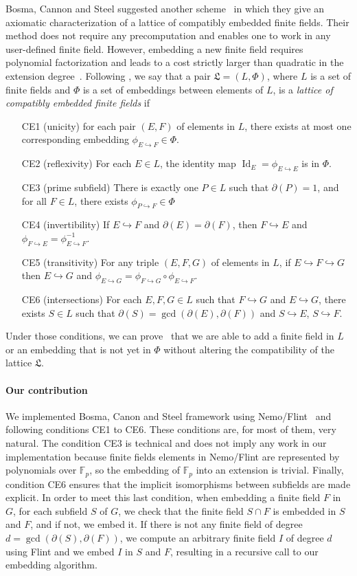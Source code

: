 \documentclass[12pt]{article}
\DeclareMathOperator{\Id}{Id}
\newcommand{\dE}{\partial(E)}
\newcommand{\dF}{\partial(F)}
\newcommand{\emb}{\hookrightarrow}
\newcommand{\embed}[2]{\phi_{#1\hookrightarrow#2}}
\begin{document}
Bosma, Cannon and Steel suggested another scheme~\cite{BCS97} in which they
give an axiomatic characterization of a lattice of compatibly embedded finite
fields. Their method does not require any precomputation and enables one to work in
any user-defined finite field. However, embedding a new finite field requires
polynomial factorization and leads to a cost strictly larger than quadratic in
the extension degree~\cite{BDDFS17}.
Following \cite{BCS97}, we say that a pair $\mathfrak L=(L, \Phi)$, where
$L$ is a set of finite fields and $\Phi$ is a set of embeddings between
elements of $L$, is a \emph{lattice of compatibly
embedded finite fields} if
\begin{enumerate}
  \item[CE1] (unicity) for each pair $(E, F)$ of elements in $L$, there exists
    at most one corresponding embedding $\embed{E}{F}\in\Phi$.
  \item[CE2] (reflexivity) For each $E\in L$, the identity map
    $\Id_E=\embed{E}{E}$ is in $\Phi$.
  \item[CE3] (prime subfield) There is exactly one $P\in L$ such that $\partial
    (P) = 1$, and for all $F\in L$, there exists $\embed{P}{F}\in\Phi$
  \item[CE4] (invertibility) If $E\emb F$ and $\dE=\dF$, then $F\emb E$ and
    $\embed{F}{E}=\embed{E}{F}^{-1}$.
  \item[CE5] (transitivity) For any triple $(E, F, G)$ of elements in $L$, if $E\emb
    F\emb G$ then $E\emb G$ and
    $\embed{E}{G}=\embed{F}{G}\circ\embed{E}{F}$.
  \item[CE6](intersections) For each $E, F, G\in L$ such that $F\emb G$ and
    $E\emb G$, there exists $S\in L$ such that $\partial(S)=\gcd(\dE, \dF)$
    and $S\emb E$, $S\emb F$.
\end{enumerate}

Under those conditions, we can prove~\cite{BCS97} that we are able to add a
finite field in
$L$ or an embedding that is not yet in $\Phi$ without altering the compatibility
of the lattice $\mathfrak L$.

\paragraph{Our contribution}

We implemented Bosma, Canon and Steel framework using Nemo/Flint~\cite{Nemo,
Flint} and following conditions CE1 to CE6. These
conditions are, for most of them, very natural. The condition CE3 is
technical and does not imply any work in our implementation because
finite fields elements in Nemo/Flint are represented by
polynomials over $\mathbb{F}_p$, so the embedding of $\mathbb{F}_p$ into an
extension is trivial. Finally, condition
CE6 ensures that the implicit isomorphisms between subfields are made
explicit. In order to meet this last condition, when embedding a finite field
$F$ in $G$, for each subfield $S$ of $G$, we check that the finite field $S\cap F$ is 
embedded in $S$ and $F$, and if not, we embed it. If there is not
any finite field of degree $d=\gcd(\partial(S), \dF)$, we compute an
arbitrary finite field $I$ of degree $d$ using Flint
and we embed $I$ in $S$ and $F$, resulting in a recursive call to our
embedding algorithm. 
\end{document}
